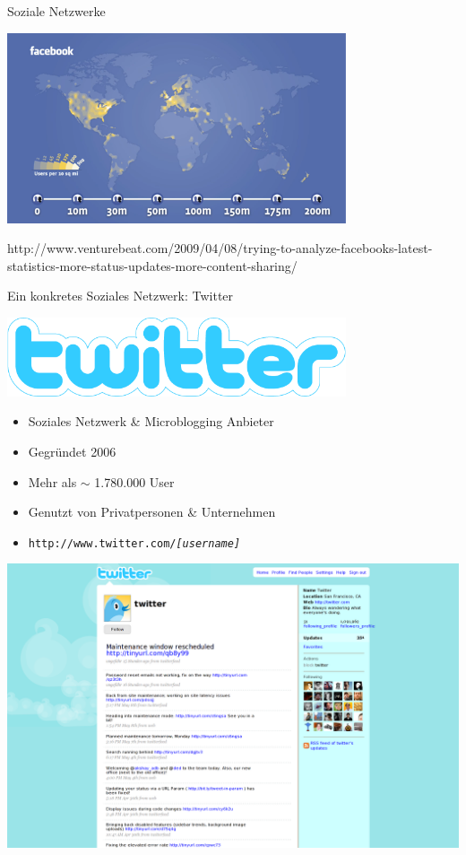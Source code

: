 \documentclass[11pt]{beamer}
\begin{document}
\begin{frame}[t]{Soziale Netzwerke}
  \begin{center}
    \includegraphics[width=0.75\textwidth]{fbmap}

    {\tiny
    http://www.venturebeat.com/2009/04/08/trying-to-analyze-facebooks-latest-statistics-more-status-updates-more-content-sharing/
    }
  \end{center}
\end{frame}

\begin{frame}[t]{Ein konkretes Soziales Netzwerk: Twitter}
  \begin{center}
    \includegraphics[width=0.75\textwidth]{twitter_logo}
  \end{center}
  \begin{itemize}
    \item Soziales Netzwerk \& Microblogging Anbieter
    \item Gegründet 2006
    \item Mehr als $\sim$ 1.780.000 User
    \item Genutzt von Privatpersonen \& Unternehmen
    \item \texttt{http://www.twitter.com/\textit{[username]}}
  \end{itemize}
\end{frame}

\begin{frame}[t]
  \begin{center}
    \includegraphics[width=\textwidth]{twitter_home}
  \end{center}
\end{frame}
\end{document}
